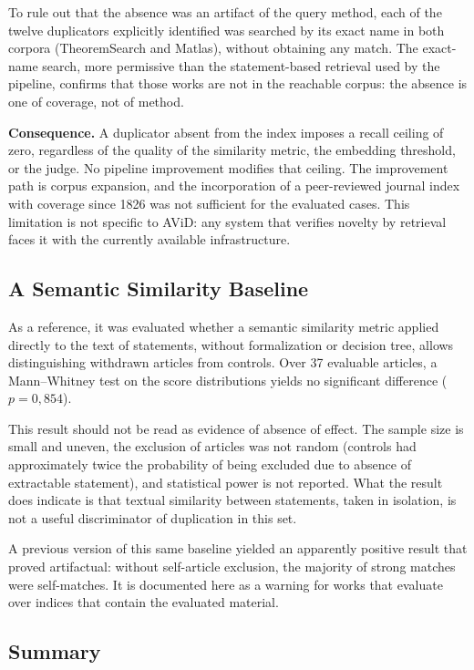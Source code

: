 \documentclass[12pt,a4paper]{article}
\theoremstyle{remark}
\begin{document}
To rule out that the absence was an artifact of the query method, each of the twelve duplicators explicitly identified was searched by its exact name in both corpora (TheoremSearch and Matlas), without obtaining any match. The exact-name search, more permissive than the statement-based retrieval used by the pipeline, confirms that those works are not in the reachable corpus: the absence is one of coverage, not of method.

\textbf{Consequence.} A duplicator absent from the index imposes a recall ceiling of zero, regardless of the quality of the similarity metric, the embedding threshold, or the judge. No pipeline improvement modifies that ceiling. The improvement path is corpus expansion, and the incorporation of a peer-reviewed journal index with coverage since 1826 was not sufficient for the evaluated cases. This limitation is not specific to AViD: any system that verifies novelty by retrieval faces it with the currently available infrastructure.

\subsection{A Semantic Similarity Baseline}

As a reference, it was evaluated whether a semantic similarity metric applied directly to the text of statements, without formalization or decision tree, allows distinguishing withdrawn articles from controls. Over 37 evaluable articles, a Mann--Whitney test on the score distributions yields no significant difference ($p = 0{,}854$).

This result should not be read as evidence of absence of effect. The sample size is small and uneven, the exclusion of articles was not random (controls had approximately twice the probability of being excluded due to absence of extractable statement), and statistical power is not reported. What the result does indicate is that textual similarity between statements, taken in isolation, is not a useful discriminator of duplication in this set.

A previous version of this same baseline yielded an apparently positive result that proved artifactual: without self-article exclusion, the majority of strong matches were self-matches. It is documented here as a warning for works that evaluate over indices that contain the evaluated material.

\subsection{Summary}
\end{document}
